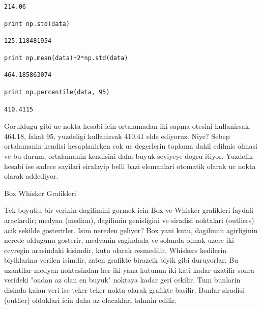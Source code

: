\documentclass[12pt,fleqn]{article}\usepackage{../common}
\begin{document}
\begin{verbatim}
214.06
\end{verbatim}

\begin{verbatim}
print np.std(data)
\end{verbatim}

\begin{verbatim}
125.118481954
\end{verbatim}

\begin{verbatim}
print np.mean(data)+2*np.std(data)
\end{verbatim}

\begin{verbatim}
464.185863074
\end{verbatim}

\begin{verbatim}
print np.percentile(data, 95)
\end{verbatim}

\begin{verbatim}
410.4115
\end{verbatim}

Goruldugu gibi uc nokta hesabi icin ortalamadan iki sapma otesini
kullanirsak, 464.18, fakat 95. yuzdeligi kullanirsak 410.41 elde
ediyoruz. Niye? Sebep ortalamanin kendisi hesaplanirken cok uc
degerlerin toplama dahil edilmis olmasi ve bu durum, ortalamanin
kendisini daha buyuk seviyeye dogru itiyor. Yuzdelik hesabi ise sadece
sayilari siralayip belli bazi elemanlari otomatik olarak uc nokta
olarak addediyor.

Box Whisker Grafikleri

Tek boyutlu bir verinin dagilimini gormek icin Box ve Whisker grafikleri
faydali araclardir; medyan (median), dagilimin genisligini ve siradisi
noktalari (outliers) acik sekilde gosterirler. Isim nereden geliyor? Box
yani kutu, dagilimin agirliginin nerede oldugunu gosterir, medyanin
sagindada ve solunda olmak uzere iki ceyregin arasindaki kisimdir, kutu
olarak resmedilir. Whiskers kedilerin biyiklarina verilen isimdir, zaten
grafikte birazcik biyik gibi duruyorlar. Bu uzantilar medyan noktasindan
her iki yana kutunun iki kati kadar uzatilir sonra verideki "ondan az olan
en buyuk" noktaya kadar geri cekilir. Tum bunlarin disinda kalan veri ise
teker teker nokta olarak grafikte basilir. Bunlar siradisi (outlier)
olduklari icin daha az olacaklari tahmin edilir.
\end{document}
